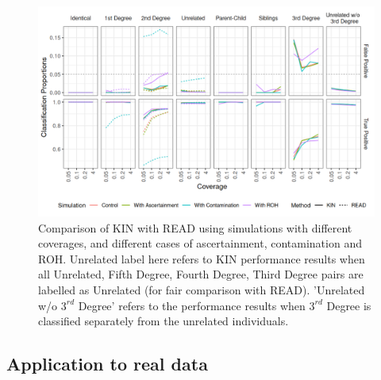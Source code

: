 \documentclass[12pt, letterpaper]{article}
\begin{document}
\begin{figure}[h!]
    \includegraphics[width=16cm]{plots/plotimg/comparison_plot.png}
    \centering
    \caption{Comparison of KIN with READ using simulations with different coverages, and different cases of ascertainment, contamination and ROH. Unrelated label here refers to KIN performance results when all Unrelated, Fifth Degree, Fourth Degree, Third Degree pairs are labelled as Unrelated (for fair comparison with READ). 'Unrelated w/o $3^{rd}$ Degree' refers to the performance results when $3^{rd}$ Degree is classified separately from the unrelated individuals.}
    \label{fig3:Comparison_READ_KIN}
\end{figure}


\subsection{Application to real data}
\end{document}
